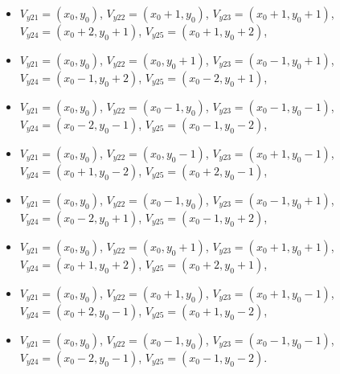 \begin{itemize}
 \item $V_{y21}=(x_{0},y_{0})$, $V_{y22}=(x_{0}+1,y_{0})$, $V_{y23}=(x_{0}+1,y_{0}+1)$, $V_{y24}=(x_{0}+2,y_{0}+1)$, $V_{y25}=(x_{0}+1,y_{0}+2)$,
 \item $V_{y21}=(x_{0},y_{0})$, $V_{y22}=(x_{0},y_{0}+1)$, $V_{y23}=(x_{0}-1,y_{0}+1)$, $V_{y24}=(x_{0}-1,y_{0}+2)$, $V_{y25}=(x_{0}-2,y_{0}+1)$,
 \item $V_{y21}=(x_{0},y_{0})$, $V_{y22}=(x_{0}-1,y_{0})$, $V_{y23}=(x_{0}-1,y_{0}-1)$, $V_{y24}=(x_{0}-2,y_{0}-1)$, $V_{y25}=(x_{0}-1,y_{0}-2)$,
 \item $V_{y21}=(x_{0},y_{0})$, $V_{y22}=(x_{0},y_{0}-1)$, $V_{y23}=(x_{0}+1,y_{0}-1)$, $V_{y24}=(x_{0}+1,y_{0}-2)$, $V_{y25}=(x_{0}+2,y_{0}-1)$,
 \item $V_{y21}=(x_{0},y_{0})$, $V_{y22}=(x_{0}-1,y_{0})$, $V_{y23}=(x_{0}-1,y_{0}+1)$, $V_{y24}=(x_{0}-2,y_{0}+1)$, $V_{y25}=(x_{0}-1,y_{0}+2)$,
 \item $V_{y21}=(x_{0},y_{0})$, $V_{y22}=(x_{0},y_{0}+1)$, $V_{y23}=(x_{0}+1,y_{0}+1)$, $V_{y24}=(x_{0}+1,y_{0}+2)$, $V_{y25}=(x_{0}+2,y_{0}+1)$,
 \item $V_{y21}=(x_{0},y_{0})$, $V_{y22}=(x_{0}+1,y_{0})$, $V_{y23}=(x_{0}+1,y_{0}-1)$, $V_{y24}=(x_{0}+2,y_{0}-1)$, $V_{y25}=(x_{0}+1,y_{0}-2)$,
 \item $V_{y21}=(x_{0},y_{0})$, $V_{y22}=(x_{0}-1,y_{0})$, $V_{y23}=(x_{0}-1,y_{0}-1)$, $V_{y24}=(x_{0}-2,y_{0}-1)$, $V_{y25}=(x_{0}-1,y_{0}-2)$.
\end{itemize}
